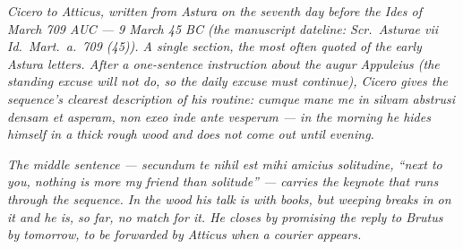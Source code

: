 
\textit{Cicero to Atticus, written from Astura on the
seventh day before the Ides of March 709 AUC --- 9
March 45 BC (the manuscript dateline: \textit{Scr.\
Asturae vii Id.\ Mart.\ a.\ 709 (45)}). A single
section, the most often quoted of the early Astura
letters. After a one-sentence instruction about the
augur Appuleius (the standing excuse will not do, so
the daily excuse must continue), Cicero gives the
sequence's clearest description of his routine:
\textit{cumque mane me in silvam abstrusi densam et
asperam, non exeo inde ante vesperum} --- in the
morning he hides himself in a thick rough wood and
does not come out until evening.}

\textit{The middle sentence --- \textit{secundum te
nihil est mihi amicius solitudine}, ``next to you,
nothing is more my friend than solitude'' --- carries
the keynote that runs through the sequence. In the
wood his talk is with books, but weeping breaks in on
it and he is, so far, no match for it. He closes by
promising the reply to Brutus by tomorrow, to be
forwarded by Atticus when a courier appears.}
